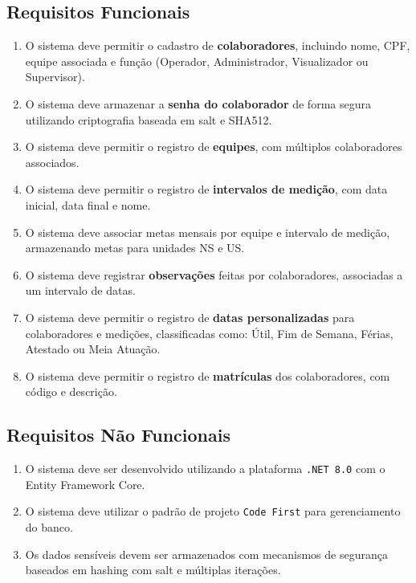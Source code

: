 \documentclass[12pt]{article}
\begin{document}
\subsection{Requisitos Funcionais}

\begin{enumerate}[label=RF\arabic*.]
    \item O sistema deve permitir o cadastro de \textbf{colaboradores}, incluindo nome, CPF, equipe associada e função (Operador, Administrador, Visualizador ou Supervisor).
    \item O sistema deve armazenar a \textbf{senha do colaborador} de forma segura utilizando criptografia baseada em salt e SHA512.
    \item O sistema deve permitir o registro de \textbf{equipes}, com múltiplos colaboradores associados.
    \item O sistema deve permitir o registro de \textbf{intervalos de medição}, com data inicial, data final e nome.
    \item O sistema deve associar metas mensais por equipe e intervalo de medição, armazenando metas para unidades NS e US.
    \item O sistema deve registrar \textbf{observações} feitas por colaboradores, associadas a um intervalo de datas.
    \item O sistema deve permitir o registro de \textbf{datas personalizadas} para colaboradores e medições, classificadas como: Útil, Fim de Semana, Férias, Atestado ou Meia Atuação.
    \item O sistema deve permitir o registro de \textbf{matrículas} dos colaboradores, com código e descrição.
\end{enumerate}

\subsection{Requisitos Não Funcionais}

\begin{enumerate}[label=RNF\arabic*.]
    \item O sistema deve ser desenvolvido utilizando a plataforma \texttt{.NET 8.0} com o Entity Framework Core.
    \item O sistema deve utilizar o padrão de projeto \texttt{Code First} para gerenciamento do banco.
    \item Os dados sensíveis devem ser armazenados com mecanismos de segurança baseados em hashing com salt e múltiplas iterações.
\end{enumerate}
\end{document}
